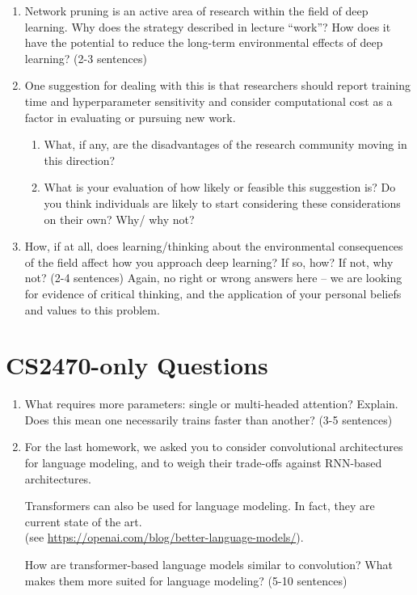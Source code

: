 \documentclass{article}
\begin{document}
\begin{enumerate}

\item Network pruning is an active area of research within the field of deep learning. Why does the strategy described in lecture “work”? How does it have the potential to reduce the long-term environmental effects of deep learning? (2-3 sentences)

\item One suggestion for dealing with this is that researchers should report training time and hyperparameter sensitivity and consider computational cost as a factor in evaluating or pursuing new work. 
\begin{enumerate}
    \item What, if any, are the disadvantages of the research community moving in this direction?

\item What is your evaluation of how likely or feasible this suggestion is? Do you think individuals are likely to start considering these considerations on their own? Why/ why not? 

\end{enumerate}


\item How, if at all, does learning/thinking about the environmental consequences of the field affect how you approach deep learning? If so, how? If not, why not?  (2-4 sentences) Again, no right or wrong answers here -- we are looking for evidence of critical thinking, and the application of your personal beliefs and values to this problem.

\end{enumerate}


\section{CS2470-only Questions}

\begin{enumerate}
\item What requires more parameters: single or multi-headed attention? Explain. Does this mean one necessarily trains faster than another? (3-5 sentences)

\item For the last homework, we asked you to consider convolutional architectures for language modeling, and to weigh their trade-offs against RNN-based architectures.

Transformers can also be used for language modeling. In fact, they are current state of the art.
\\
(see  \url{https://openai.com/blog/better-language-models/}).

How are transformer-based language models similar to convolution? What makes them more suited for language modeling? (5-10 sentences)



\end{enumerate}
\end{document}

